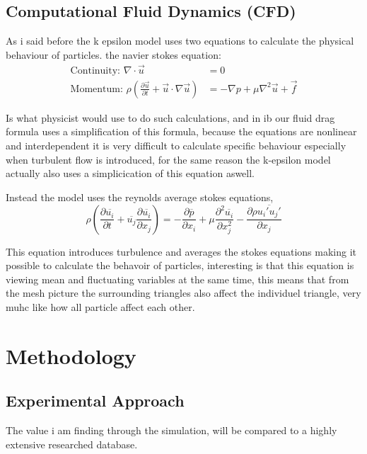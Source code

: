 \documentclass[12pt,a4paper]{article}
\begin{document}
\subsection{Computational Fluid Dynamics (CFD)}

As i said before the k epsilon model uses two equations to calculate the physical behaviour of particles.
the navier stokes equation: 
\begin{align}
\text{Continuity: } \nabla \cdot \vec{u} &= 0\\
\text{Momentum: } \rho\left(\frac{\partial \vec{u}}{\partial t} + \vec{u} \cdot \nabla \vec{u}\right) &= -\nabla p + \mu \nabla^2 \vec{u} + \vec{f}
\end{align}

Is what physicist would use to do such calculations, and in ib our fluid drag formula uses a simplification of this formula, because the equations are nonlinear and interdependent it is very difficult to calculate specific behaviour especially when turbulent flow is introduced, for the same reason the k-epsilon model actually also uses a simplicication of this equation aswell.

Instead the model uses the reynolds average stokes equations,
\begin{equation}
\rho\left(\frac{\partial \overline{u_i}}{\partial t} + \overline{u_j}\frac{\partial \overline{u_i}}{\partial x_j}\right) = -\frac{\partial \overline{p}}{\partial x_i} + \mu\frac{\partial^2 \overline{u_i}}{\partial x_j^2} - \frac{\partial \rho\overline{u_i' u_j'}}{\partial x_j}
\end{equation}

This equation introduces turbulence and averages the stokes equations making it possible to calculate the behavoir of particles, interesting is that this equation is viewing mean and fluctuating variables at the same time, this means that from the mesh picture the surrounding triangles also affect the individuel triangle, very muhc like how all particle affect each other.

\section{Methodology}

\subsection{Experimental Approach}

The value i am finding through the simulation, will be compared to a highly extensive researched database.
\end{document}
